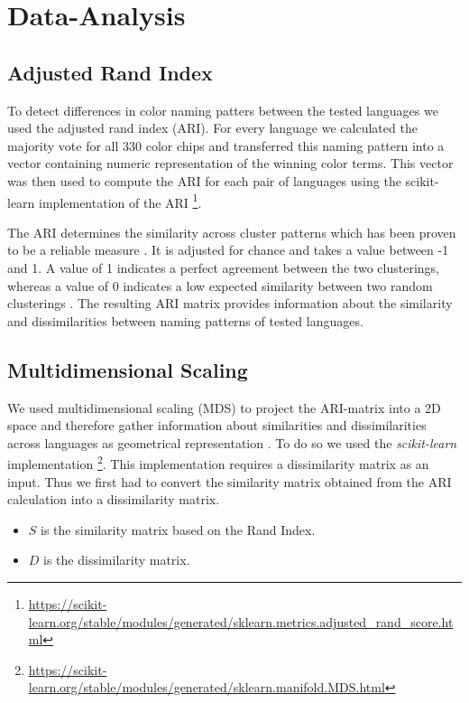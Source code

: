 \section{Data-Analysis}

\subsection{Adjusted Rand Index}
To detect differences in color naming patters between the tested languages we used the adjusted rand index (ARI).
For every language we calculated the majority vote for all 330 color chips and transferred this naming pattern into a vector containing numeric representation of the winning color terms. This vector was then used to compute the ARI for each pair of languages using the scikit-learn implementation of the ARI \footnote{\url{https://scikit-learn.org/stable/modules/generated/sklearn.metrics.adjusted_rand_score.html}}. 

The ARI determines the similarity across cluster patterns which has been proven to be a reliable measure \parencite{rand1971objective}. It is adjusted for chance and takes a value between -1 and 1. A value of 1 indicates a perfect agreement between the two clusterings, whereas a value of 0 indicates a low expected similarity between two random clusterings \parencite{Hubert1985}. The resulting ARI matrix provides information about the similarity and dissimilarities between naming patterns of tested languages.


\subsection{Multidimensional Scaling}
We used multidimensional scaling (MDS) to project the ARI-matrix into a 2D space and therefore gather information about similarities and dissimilarities across languages as geometrical representation \parencite{carroll1998multidimensional}.
To do so we used the \textit{scikit-learn }implementation \footnote{\url{https://scikit-learn.org/stable/modules/generated/sklearn.manifold.MDS.html}}.
This implementation requires a dissimilarity matrix as an input. Thus we first had to convert the similarity matrix obtained from the ARI calculation into a dissimilarity matrix.


\begin{itemize}
    \item $S$ is the similarity matrix based on the Rand Index.
    \item $D$ is the dissimilarity matrix.
\end{itemize}

